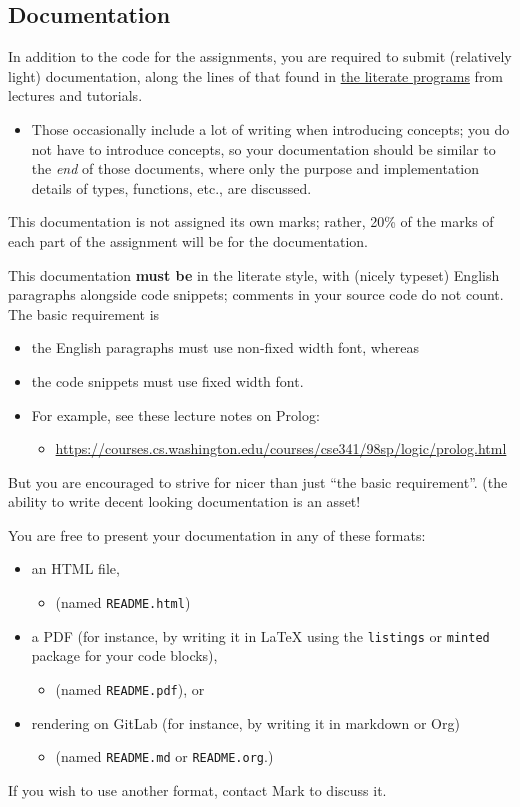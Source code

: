 \documentclass[11pt]{article}
\begin{document}
\subsection*{Documentation}
\label{sec:org140e83f}
In addition to the code for the assignments,
you are required to submit (relatively light) documentation,
along the lines of that found in
\href{https://armkeh.github.io/principles-of-programming-languages/\#outline-container-Lecture-literate-programs}{the literate programs}
from lectures and tutorials.
\begin{itemize}
\item Those occasionally include a lot of writing when introducing concepts;
you do not have to introduce concepts, so your documentation
should be similar to the \emph{end} of those documents,
where only the purpose and implementation details
of types, functions, etc., are discussed.
\end{itemize}

This documentation is not assigned its own marks;
rather, 20\% of the marks of each part of the assignment
will be for the documentation.

This documentation \textbf{must be} in the literate style,
with (nicely typeset) English paragraphs alongside code snippets;
comments in your source code do not count.
The basic requirement is
\begin{itemize}
\item the English paragraphs must use non-fixed width font, whereas
\item the code snippets must use fixed width font.
\item For example, see these lecture notes on Prolog:
\begin{itemize}
\item \url{https://courses.cs.washington.edu/courses/cse341/98sp/logic/prolog.html}
\end{itemize}
\end{itemize}
But you are encouraged to strive for nicer than just
“the basic requirement”.
(the ability to write decent looking documentation is an asset!

You are free to present your documentation in any of these formats:
\begin{itemize}
\item an HTML file,
\begin{itemize}
\item (named \texttt{README.html})
\end{itemize}
\item a PDF (for instance, by writing it in \LaTeX{} using
the \texttt{listings} or \texttt{minted} package for your code blocks),
\begin{itemize}
\item (named \texttt{README.pdf}), or
\end{itemize}
\item rendering on GitLab (for instance, by writing it in markdown or Org)
\begin{itemize}
\item (named \texttt{README.md} or \texttt{README.org}.)
\end{itemize}
\end{itemize}
If you wish to use another format, contact Mark to discuss it.
\end{document}
